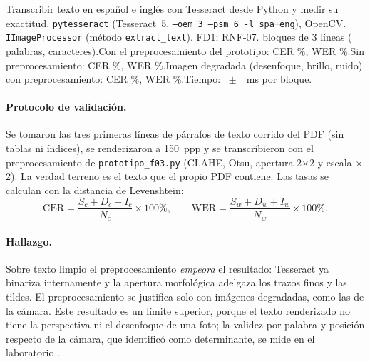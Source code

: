 {Transcribir texto en español e inglés con Tesseract desde Python y medir su exactitud.}
{\texttt{pytesseract} (Tesseract~5, \texttt{--oem 3 --psm 6 -l spa+eng}), OpenCV.}
{\texttt{IImageProcessor} (método \texttt{extract\_text}).}
{FD1; RNF-07.}
{ \FTresBloques{} bloques de 3 líneas (\FTresPalabras{} palabras, \FTresCaracteres{} caracteres).\newline Con el preprocesamiento del prototipo: CER \FTresCerLimpioPct\%, WER \FTresWerLimpioPct\%.\newline Sin preprocesamiento: CER \FTresCerSinPreprocesoPct\%, WER \FTresWerSinPreprocesoPct\%.\newline Imagen degradada (desenfoque, brillo, ruido) con preprocesamiento: CER \FTresCerDegradadoPct\%, WER \FTresWerDegradadoPct\%.\newline Tiempo: \FTresTiempoMs~$\pm$~\FTresTiempoSdMs~ms por bloque.}

\paragraph{Protocolo de validación.} Se tomaron las tres primeras líneas de \FTresBloques{} párrafos de texto corrido del PDF (sin tablas ni índices), se renderizaron a 150~ppp y se transcribieron con el preprocesamiento de \texttt{prototipo\_f03.py} (CLAHE, Otsu, apertura 2$\times$2 y escala $\times$2). La verdad terreno es el texto que el propio PDF contiene. Las tasas se calculan con la distancia de Levenshtein:
\begin{equation}
\mathrm{CER}=\frac{S_c+D_c+I_c}{N_c}\times100\%,\qquad\mathrm{WER}=\frac{S_w+D_w+I_w}{N_w}\times100\%.
\end{equation}

\paragraph{Hallazgo.} Sobre texto limpio el preprocesamiento \emph{empeora} el resultado: Tesseract ya binariza internamente y la apertura morfológica adelgaza los trazos finos y las tildes. El preprocesamiento se justifica solo con imágenes degradadas, como las de la cámara. Este resultado es un límite superior, porque el texto renderizado no tiene la perspectiva ni el desenfoque de una foto; la validez por palabra y posición respecto de la cámara, que \citet{ibaceta2023} identificó como determinante, se mide en el laboratorio .

